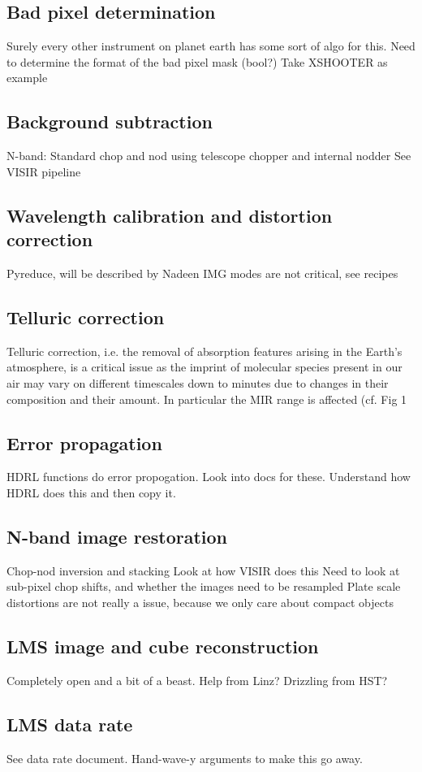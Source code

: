 \subsection{Bad pixel determination}

Surely every other instrument on planet earth has some sort of algo for this.
Need to determine the format of the bad pixel mask (bool?)
Take XSHOOTER as example

\subsection{Background subtraction}

N-band: Standard chop and nod using telescope chopper and internal nodder
See VISIR pipeline

\subsection{Wavelength calibration and distortion correction}

Pyreduce, will be described by Nadeen
IMG modes are not critical, see recipes

\subsection{Telluric correction}
Telluric correction, i.e. the removal of absorption features arising in the Earth's atmosphere, is a critical issue as the imprint of molecular species present in our air may vary on different timescales down to minutes due to changes in their composition and their amount. In particular the \ac{MIR} range is affected (cf. Fig 1 


\subsection{Error propagation}

HDRL functions do error propogation. Look into docs for these. 
Understand how HDRL does this and then copy it.

\subsection{N-band image restoration}

Chop-nod inversion and stacking
Look at how VISIR does this
Need to look at sub-pixel chop shifts, and whether the images need to be resampled
Plate scale distortions are not really a issue, because we only care about compact objects

\subsection{LMS image and cube reconstruction}

Completely open and a bit of a beast. 
Help from Linz?
Drizzling from HST?

\subsection{LMS data rate}

See data rate document. 
Hand-wave-y arguments to make this go away.


